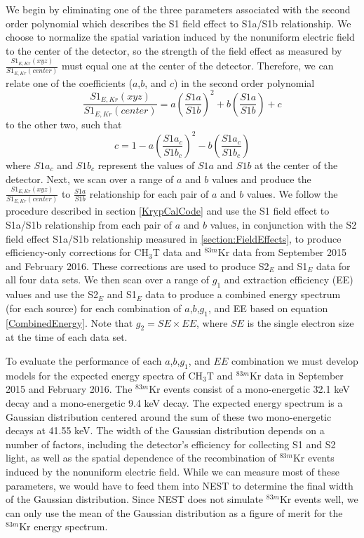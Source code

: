 We begin by eliminating one of the three parameters associated with the second order polynomial which describes the S1 field effect to S1a/S1b relationship.  We choose to normalize the spatial variation induced by the nonuniform electric field to the center of the detector, so the strength of the field effect as measured by $\frac{S1_{E,Kr}(xyz)}{S1_{E,Kr}(center)}$ must equal one at the center of the detector.  Therefore, we can relate one of the coefficients ($a$,$b$, and $c$) in the second order polynomial
\begin{equation}
 \frac{S1_{E,Kr}(xyz)}{S1_{E,Kr}(center)} = a\left(\frac{S1a}{S1b}\right)^2 + b\left(\frac{S1a}{S1b} \right) + c
 \end{equation}
 to the other two, such that
 \begin{equation}
 c=1-a\left(\frac{S1a_c}{S1b_c}\right)^2-b\left(\frac{S1a_c}{S1b_c}\right)
 \end{equation}
 where $S1a_c$ and $S1b_c$ represent the values of $S1a$ and $S1b$ at the center of the detector.  Next, we scan over a range of $a$ and $b$ values and produce the $\frac{S1_{E,Kr}(xyz)}{S1_{E,Kr}(center)}$ to $\frac{S1a}{S1b}$ relationship for each pair of $a$ and $b$ values.  We follow the procedure described in section \ref{KrypCalCode} and use the S1 field effect to S1a/S1b relationship from each pair of $a$ and $b$ values, in conjunction with the S2 field effect S1a/S1b relationship measured in \ref{section:FieldEffects}, to produce efficiency-only corrections for CH$_3$T data and $^{83m}$Kr data from September 2015 and February 2016. These corrections are used to produce S2$_E$ and S1$_E$ data for all four data sets.  We then scan over a range of $g_1$ and extraction efficiency (EE) values and use the S2$_E$ and S1$_E$ data to produce a combined energy spectrum (for each source) for each combination of $a$,$b$,$g_1$, and EE based on equation \ref{CombinedEnergy}.  Note that $g_2=SE \times EE$, where $SE$ is the single electron size at the time of each data set.  

To evaluate the performance of each $a$,$b$,$g_1$, and $EE$ combination we must develop models for the expected energy spectra of CH$_3$T and $^{83m}$Kr data in September 2015 and February 2016.  The $^{83m}$Kr events consist of a mono-energetic 32.1 keV decay and a mono-energetic 9.4 keV decay.  The expected energy spectrum is a Gaussian distribution centered around the sum of these two mono-energetic decays at 41.55 keV.  The width of the Gaussian distribution depends on a number of factors, including the detector's efficiency for collecting S1 and S2 light, as well as the spatial dependence of the recombination of $^{83m}$Kr events induced by the nonuniform electric field.  While we can measure most of these parameters, we would have to feed them into NEST to determine the final width of the Gaussian distribution.  Since NEST does not simulate $^{83m}$Kr events well, we can only use the mean of the Gaussian distribution as a figure of merit for the $^{83m}$Kr energy spectrum.

